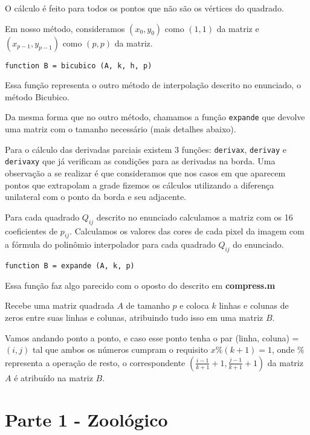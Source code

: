 \documentclass[12pt,letterpaper]{article}
\begin{document}
    O cálculo é feito para todos os pontos que não são os vértices do quadrado.

    Em nosso método, consideramos $(x_0, y_0)$ como $(1, 1)$ da matriz e $(x_{p-1}, y_{p-1})$ como $(p, p)$ da matriz.

    \begin{center}
        \texttt{function B = bicubico (A, k, h, p)}
    \end{center}

    Essa função representa o outro método de interpolação descrito no enunciado, o método Bicubico.

    Da mesma forma que no outro método, chamamos a função \texttt{expande} que devolve uma matriz com o tamanho necessário (mais detalhes abaixo).

    Para o cálculo das derivadas parciais existem 3 funções: \texttt{derivax}, \texttt{derivay} e \texttt{derivaxy} que já verificam as condições para as derivadas na borda. Uma observação a se realizar é que consideramos que nos casos em que aparecem pontos que extrapolam a grade fizemos os cálculos utilizando a diferença unilateral com o ponto da borda e seu adjacente.

    Para cada quadrado $Q_{ij}$ descrito no enunciado calculamos a matriz com os 16 coeficientes de $p_{ij}$. Calculamos os valores das cores de cada pixel da imagem com a fórmula do polinômio interpolador para cada quadrado $Q_{ij}$ do enunciado.

    \begin{center}
        \texttt{function B = expande (A, k, p)}
    \end{center}

    Essa função faz algo parecido com o oposto do descrito em \textbf{compress.m}

    Recebe uma matriz quadrada $A$ de tamanho $p$ e coloca $k$ linhas e colunas de zeros entre suas linhas e colunas, atribuindo tudo isso em uma matriz $B$.

    Vamos andando ponto a ponto, e caso esse ponto tenha o par (linha, coluna) = $(i, j)$ tal que ambos os números cumpram o requisito $x\%(k+1)=1$, onde $\%$ representa a operação de resto, o correspondente $(\frac{i-1}{k+1}+1, \frac{j-1}{k+1}+1)$ da matriz $A$ é atribuído na matriz $B$.

    \section{Parte 1 - Zoológico}
\end{document}
